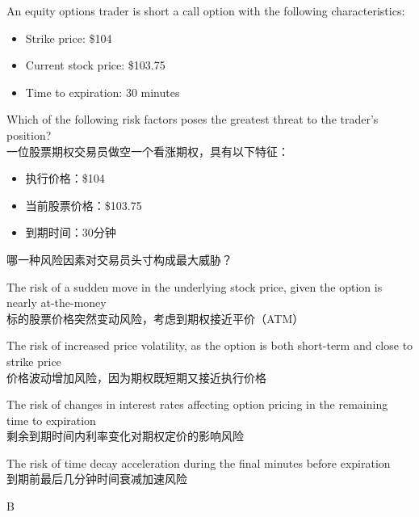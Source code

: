 \documentclass{article}
\newcounter{question} %
\begin{document}
        \begin{question}
            An equity options trader is short a call option with the following characteristics:
            \begin{itemize}
                \item Strike price: \$104
                \item Current stock price: \$103.75
                \item Time to expiration: 30 minutes
            \end{itemize}
            Which of the following risk factors poses the greatest threat to the trader's position?
            \\一位股票期权交易员做空一个看涨期权，具有以下特征：
            \begin{itemize}
                \item 执行价格：\$104
                \item 当前股票价格：\$103.75
                \item 到期时间：30分钟
            \end{itemize}
            哪一种风险因素对交易员头寸构成最大威胁？
            \end{question}
            
            \begin{choices}
            \item The risk of a sudden move in the underlying stock price, given the option is nearly at-the-money\\
            标的股票价格突然变动风险，考虑到期权接近平价（ATM）
            \item The risk of increased price volatility, as the option is both short-term and close to strike price\\
            价格波动增加风险，因为期权既短期又接近执行价格
            \item The risk of changes in interest rates affecting option pricing in the remaining time to expiration\\
            剩余到期时间内利率变化对期权定价的影响风险
            \item The risk of time decay acceleration during the final minutes before expiration\\
            到期前最后几分钟时间衰减加速风险
            \end{choices}
            
            \begin{correctanswer}
            B
            \end{correctanswer}
            
\end{document}
